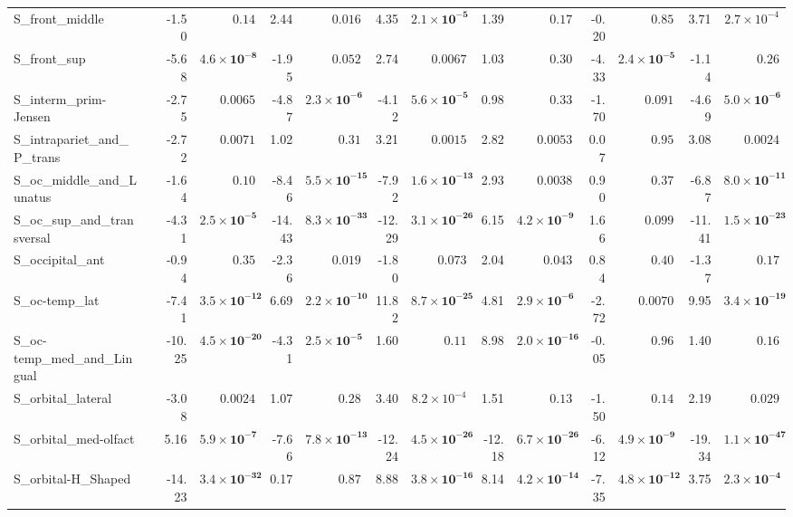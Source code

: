 {\begin{longtable}{llrrrrrrrrrrrr}
S\_front\_middle &  & -1.50 & $0.14$ & 2.44 & $0.016$ & 4.35 & $\mathbf{2.1{\times}10^{-5}}$ & 1.39 & $0.17$ & -0.20 & $0.85$ & 3.71 & $2.7{\times}10^{-4}$ \\
S\_front\_sup &  & -5.68 & $\mathbf{4.6{\times}10^{-8}}$ & -1.95 & $0.052$ & 2.74 & $0.0067$ & 1.03 & $0.30$ & -4.33 & $\mathbf{2.4{\times}10^{-5}}$ & -1.14 & $0.26$ \\
S\_interm\_prim-Jensen &  & -2.75 & $0.0065$ & -4.87 & $\mathbf{2.3{\times}10^{-6}}$ & -4.12 & $\mathbf{5.6{\times}10^{-5}}$ & 0.98 & $0.33$ & -1.70 & $0.091$ & -4.69 & $\mathbf{5.0{\times}10^{-6}}$ \\
S\_intrapariet\_and\_P\_trans &  & -2.72 & $0.0071$ & 1.02 & $0.31$ & 3.21 & $0.0015$ & 2.82 & $0.0053$ & 0.07 & $0.95$ & 3.08 & $0.0024$ \\
S\_oc\_middle\_and\_Lunatus &  & -1.64 & $0.10$ & -8.46 & $\mathbf{5.5{\times}10^{-15}}$ & -7.92 & $\mathbf{1.6{\times}10^{-13}}$ & 2.93 & $0.0038$ & 0.90 & $0.37$ & -6.87 & $\mathbf{8.0{\times}10^{-11}}$ \\
S\_oc\_sup\_and\_transversal &  & -4.31 & $\mathbf{2.5{\times}10^{-5}}$ & -14.43 & $\mathbf{8.3{\times}10^{-33}}$ & -12.29 & $\mathbf{3.1{\times}10^{-26}}$ & 6.15 & $\mathbf{4.2{\times}10^{-9}}$ & 1.66 & $0.099$ & -11.41 & $\mathbf{1.5{\times}10^{-23}}$ \\
S\_occipital\_ant &  & -0.94 & $0.35$ & -2.36 & $0.019$ & -1.80 & $0.073$ & 2.04 & $0.043$ & 0.84 & $0.40$ & -1.37 & $0.17$ \\
S\_oc-temp\_lat &  & -7.41 & $\mathbf{3.5{\times}10^{-12}}$ & 6.69 & $\mathbf{2.2{\times}10^{-10}}$ & 11.82 & $\mathbf{8.7{\times}10^{-25}}$ & 4.81 & $\mathbf{2.9{\times}10^{-6}}$ & -2.72 & $0.0070$ & 9.95 & $\mathbf{3.4{\times}10^{-19}}$ \\
S\_oc-temp\_med\_and\_Lingual &  & -10.25 & $\mathbf{4.5{\times}10^{-20}}$ & -4.31 & $\mathbf{2.5{\times}10^{-5}}$ & 1.60 & $0.11$ & 8.98 & $\mathbf{2.0{\times}10^{-16}}$ & -0.05 & $0.96$ & 1.40 & $0.16$ \\
S\_orbital\_lateral &  & -3.08 & $0.0024$ & 1.07 & $0.28$ & 3.40 & $8.2{\times}10^{-4}$ & 1.51 & $0.13$ & -1.50 & $0.14$ & 2.19 & $0.029$ \\
S\_orbital\_med-olfact &  & 5.16 & $\mathbf{5.9{\times}10^{-7}}$ & -7.66 & $\mathbf{7.8{\times}10^{-13}}$ & -12.24 & $\mathbf{4.5{\times}10^{-26}}$ & -12.18 & $\mathbf{6.7{\times}10^{-26}}$ & -6.12 & $\mathbf{4.9{\times}10^{-9}}$ & -19.34 & $\mathbf{1.1{\times}10^{-47}}$ \\
S\_orbital-H\_Shaped &  & -14.23 & $\mathbf{3.4{\times}10^{-32}}$ & 0.17 & $0.87$ & 8.88 & $\mathbf{3.8{\times}10^{-16}}$ & 8.14 & $\mathbf{4.2{\times}10^{-14}}$ & -7.35 & $\mathbf{4.8{\times}10^{-12}}$ & 3.75 & $\mathbf{2.3{\times}10^{-4}}$ \\

\end{longtable}}
